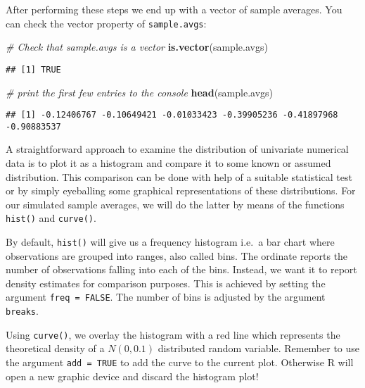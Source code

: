 \documentclass[]{book}
\newenvironment{Shaded}{\begin{snugshade}}{\end{snugshade}}
\newcommand{\KeywordTok}[1]{\textcolor[rgb]{0.13,0.29,0.53}{\textbf{#1}}}
\newcommand{\CommentTok}[1]{\textcolor[rgb]{0.56,0.35,0.01}{\textit{#1}}}
\newcommand{\NormalTok}[1]{#1}
\theoremstyle{definition}
\theoremstyle{definition}
\theoremstyle{definition}
\theoremstyle{remark}
\begin{document}
After performing these steps we end up with a vector of sample averages.
You can check the vector property of \texttt{sample.avgs}:

\begin{Shaded}
\begin{Highlighting}[]
\CommentTok{# Check that sample.avgs is a vector}
\KeywordTok{is.vector}\NormalTok{(sample.avgs) }
\end{Highlighting}
\end{Shaded}

\begin{verbatim}
## [1] TRUE
\end{verbatim}

\begin{Shaded}
\begin{Highlighting}[]
\CommentTok{# print the first few entries to the console}
\KeywordTok{head}\NormalTok{(sample.avgs)}
\end{Highlighting}
\end{Shaded}

\begin{verbatim}
## [1] -0.12406767 -0.10649421 -0.01033423 -0.39905236 -0.41897968 -0.90883537
\end{verbatim}

A straightforward approach to examine the distribution of univariate
numerical data is to plot it as a histogram and compare it to some known
or assumed distribution. This comparison can be done with help of a
suitable statistical test or by simply eyeballing some graphical
representations of these distributions. For our simulated sample
averages, we will do the latter by means of the functions
\texttt{hist()} and \texttt{curve()}.

By default, \texttt{hist()} will give us a frequency histogram i.e.~a
bar chart where observations are grouped into ranges, also called bins.
The ordinate reports the number of observations falling into each of the
bins. Instead, we want it to report density estimates for comparison
purposes. This is achieved by setting the argument
\texttt{freq\ =\ FALSE}. The number of bins is adjusted by the argument
\texttt{breaks}.

Using \texttt{curve()}, we overlay the histogram with a red line which
represents the theoretical density of a \(N(0, 0.1)\) distributed random
variable. Remember to use the argument \texttt{add\ =\ TRUE} to add the
curve to the current plot. Otherwise R will open a new graphic device
and discard the histogram plot!
\end{document}
